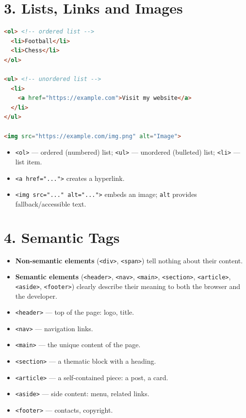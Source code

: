 \documentclass[12pt]{article}
\begin{document}
\section{3. Lists, Links and Images}
\begin{lstlisting}[language=HTML]
<ol> <!-- ordered list -->
  <li>Football</li>
  <li>Chess</li>
</ol>

<ul> <!-- unordered list -->
  <li>
    <a href="https://example.com">Visit my website</a>
  </li>
</ul>

<img src="https://example.com/img.png" alt="Image">
\end{lstlisting}
\begin{itemize}
    \item \texttt{<ol>} — ordered (numbered) list; \texttt{<ul>} — unordered (bulleted) list; \texttt{<li>} — list item.
    \item \texttt{<a href="...">} creates a hyperlink.
    \item \texttt{<img src="..." alt="...">} embeds an image; \texttt{alt} provides fallback/accessible text.
\end{itemize}

\section{4. Semantic Tags}
\begin{itemize}
    \item \textbf{Non-semantic elements} (\texttt{<div>}, \texttt{<span>}) tell nothing about their content.
    \item \textbf{Semantic elements} (\texttt{<header>}, \texttt{<nav>}, \texttt{<main>}, \texttt{<section>}, \texttt{<article>}, \texttt{<aside>}, \texttt{<footer>}) clearly describe their meaning to both the browser and the developer.
\end{itemize}
\begin{itemize}
    \item \texttt{<header>} — top of the page: logo, title.
    \item \texttt{<nav>} — navigation links.
    \item \texttt{<main>} — the unique content of the page.
    \item \texttt{<section>} — a thematic block with a heading.
    \item \texttt{<article>} — a self-contained piece: a post, a card.
    \item \texttt{<aside>} — side content: menu, related links.
    \item \texttt{<footer>} — contacts, copyright.
\end{itemize}
\end{document}
